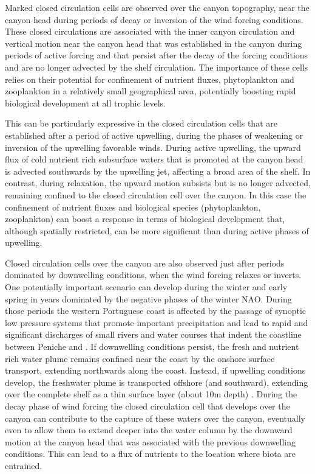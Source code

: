 Marked closed circulation cells are observed over the canyon
topography, near the canyon head during periods of decay or inversion
of the wind forcing conditions. These closed circulations are
associated with the inner canyon circulation and vertical motion near
the canyon head that was established in the canyon during periods
of active forcing and that persist after the decay of the forcing
conditions and are no longer advected by the shelf circulation. The
importance of these cells relies on their potential for confinement of
nutrient fluxes, phytoplankton and zooplankton in a relatively small
geographical area, potentially boosting rapid biological development
at all trophic levels.

This can be particularly expressive in the closed circulation cells
that are established after a period of active upwelling, during the
phases of weakening or inversion of the upwelling favorable
winds. During active upwelling, the upward flux of cold nutrient rich
subsurface waters that is promoted at the canyon head is advected
southwards by the upwelling jet, affecting a broad area of the
shelf. In contrast, during relaxation, the upward motion subsists but
is no longer advected, remaining confined to the closed circulation
cell over the canyon. In this case the confinement of nutrient fluxes
and biological species (phytoplankton, zooplankton) can boost a
response in terms of biological development that, although spatially
restricted, can be more significant than during active phases of
upwelling.

Closed circulation cells over the canyon are also observed just after
periods dominated by downwelling conditions, when the wind forcing
relaxes or inverts. One potentially important scenario can develop
during the winter and early spring in years dominated by the negative
phases of the winter NAO. During those periods the western Portuguese
coast is affected by the passage of synoptic low pressure systems that
promote important precipitation and lead to rapid and significant
discharges of small rivers and water courses that indent the coastline
between Peniche and \naze.  If downwelling conditions persist, the
fresh and nutrient rich water plume remains confined near the coast by
the onshore surface transport, extending northwards along the
coast. Instead, if upwelling conditions develop, the freshwater plume
is transported offshore (and southward), extending over the complete
shelf as a thin surface layer (about 10m depth)
\cite{martins10}. During the decay phase of wind forcing the closed
circulation cell that develops over the canyon can contribute to the
capture of these waters over the canyon, eventually even to allow them
to extend deeper into the water column by the downward motion at the
canyon head that was associated with the previous downwelling
conditions. This can lead to a flux of nutrients to the location where
biota are entrained.


